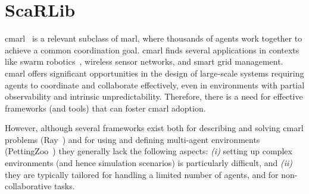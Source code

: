 %

%
%
\lstset{language=scafi}
%
%
\chapter{ScaRLib}%
%
\minitoc%
%
\acresetall

\Ac{cmarl}~\cite{yang2021many,https://doi.org/10.48550/arxiv.2106.09825}
 is a relevant subclass of \ac{marl}, 
 where thousands of agents work together to achieve a common coordination goal. 
\ac{cmarl} finds several applications in contexts like swarm robotics~\cite{huttenrauch2019deep}, wireless sensor networks, and smart grid management. 
%
\ac{cmarl} offers significant opportunities in the design of large-scale systems
 requiring agents to coordinate and collaborate effectively, 
 even in environments with partial observability and intrinsic unpredictability. 
%
Therefore, there is a need for effective frameworks (and tools) that can foster \ac{cmarl} adoption.

% 
However, although several frameworks exist both for describing and solving \ac{cmarl} problems (Ray~\cite{ray}) 
and for using and defining multi-agent environments (PettingZoo~\cite{NEURIPS2021_7ed2d345}) 
they generally lack the following aspects: \emph{(i)} setting up complex environments (and hence simulation scenarios) is particularly difficult, and 
\emph{(ii)} they are typically tailored for handling a limited number of agents, and for non-collaborative tasks.

